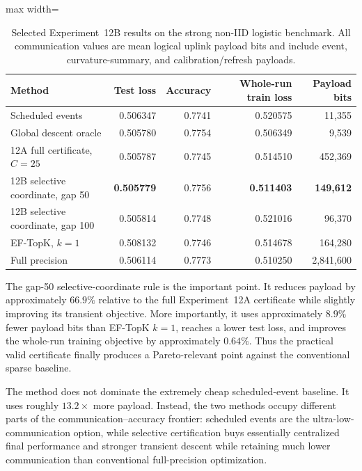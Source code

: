 \begin{table}[t]
\centering
\caption{Selected Experiment~12B results on the strong non-IID logistic benchmark. All communication values are mean logical uplink payload bits and include event, curvature-summary, and calibration/refresh payloads.}
\label{tab:exp12b-main}
\begin{adjustbox}{max width=\textwidth}
\begin{tabular}{lrrrr}
\toprule
Method & Test loss & Accuracy & Whole-run train loss & Payload bits \\
\midrule
Scheduled events & 0.506347 & 0.7741 & 0.520575 & 11,355 \\
Global descent oracle & 0.505780 & 0.7754 & 0.506349 & 9,539 \\
12A full certificate, $C=25$ & 0.505787 & 0.7745 & 0.514510 & 452,369 \\
12B selective coordinate, gap 50 & \textbf{0.505779} & 0.7756 & \textbf{0.511403} & \textbf{149,612} \\
12B selective coordinate, gap 100 & 0.505814 & 0.7748 & 0.521016 & 96,370 \\
EF-TopK, $k=1$ & 0.508132 & 0.7746 & 0.514678 & 164,280 \\
Full precision & 0.506114 & 0.7773 & 0.510250 & 2,841,600 \\
\bottomrule
\end{tabular}
\end{adjustbox}
\end{table}

The gap-50 selective-coordinate rule is the important point. It reduces payload by approximately $66.9\%$ relative to the full Experiment~12A certificate while slightly improving its transient objective. More importantly, it uses approximately $8.9\%$ fewer payload bits than EF-TopK $k=1$, reaches a lower test loss, and improves the whole-run training objective by approximately $0.64\%$. Thus the practical valid certificate finally produces a Pareto-relevant point against the conventional sparse baseline.

The method does not dominate the extremely cheap scheduled-event baseline. It uses roughly $13.2\times$ more payload. Instead, the two methods occupy different parts of the communication--accuracy frontier: scheduled events are the ultra-low-communication option, while selective certification buys essentially centralized final performance and stronger transient descent while retaining much lower communication than conventional full-precision optimization.

